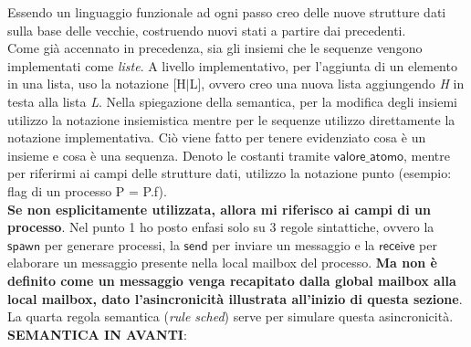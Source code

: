 \documentclass[background.tex]{subfiles}
\begin{document}
Essendo un linguaggio funzionale ad ogni passo creo delle nuove strutture dati sulla base delle vecchie, costruendo nuovi stati a partire dai precedenti.\\
Come già accennato in precedenza, sia gli insiemi che le sequenze vengono implementati come \textit{liste}. A livello implementativo, per l'aggiunta di un elemento in una lista, uso la notazione [H$\mid$L], ovvero creo una nuova lista aggiungendo \textit{H} in testa alla lista \textit{L}.
Nella spiegazione della semantica, per la modifica degli insiemi utilizzo la notazione insiemistica mentre per le sequenze utilizzo direttamente la notazione implementativa.
Ciò viene fatto per tenere evidenziato cosa è un insieme e cosa è una sequenza.
Denoto le costanti tramite $\mathsf{valore\_atomo}$, mentre per riferirmi ai campi delle strutture dati, utilizzo la notazione punto (esempio: flag di un processo P = P.f).\\
\textbf{Se non esplicitamente utilizzata, allora mi riferisco ai campi di un processo}.
Nel punto 1 ho posto enfasi solo su 3 regole sintattiche, ovvero la $\mathsf{spawn}$ per generare processi, la $\mathsf{send}$ per inviare un messaggio e la $\mathsf{receive}$ per elaborare un messaggio presente nella local mailbox del processo.
\textbf{Ma non è definito come un messaggio venga recapitato dalla global mailbox alla local mailbox, dato l'asincronicità illustrata all'inizio di questa sezione}. La quarta regola semantica (\textit{rule sched}) serve per simulare questa asincronicità.\\
\textbf{SEMANTICA IN AVANTI}:
\end{document}
